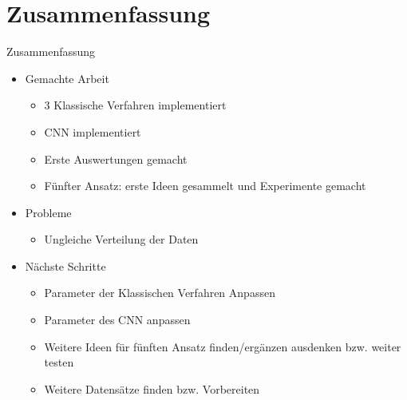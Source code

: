 \documentclass[aspectratio=169]{beamer} %
\begin{document}
\section{Zusammenfassung}
\begin{frame}
 \begin{block}{Zusammenfassung}
 
  
  \begin{itemize}
    \item Gemachte Arbeit
    \begin{itemize}
    \item 3 Klassische Verfahren implementiert
    \item CNN implementiert
    \item Erste Auswertungen gemacht
    \item F\"unfter Ansatz: erste Ideen gesammelt und Experimente gemacht
    \end{itemize}
    \item Probleme
    \begin{itemize}
    \item Ungleiche Verteilung der Daten
    \end{itemize}
    \begin{itemize}
    
    \end{itemize}
    \item N\"achste Schritte
    \begin{itemize}
    \item Parameter der Klassischen Verfahren Anpassen
    \item Parameter des CNN anpassen
    \item Weitere Ideen f\"ur f\"unften Ansatz finden/erg\"anzen
  ausdenken bzw. weiter testen
    \item Weitere Datens\"atze finden bzw. Vorbereiten
    \end{itemize}
  \end{itemize}
  \end{block}
\end{frame}
\end{document}
